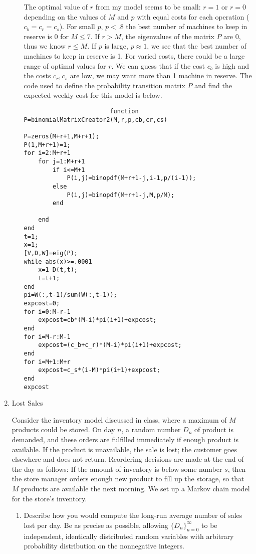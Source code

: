 \documentclass[12pt]{article}
\numberwithin{equation}{section}
\begin{document}
\begin{enumerate}
\begin{enumerate}
                        The optimal value of $r$ from my model seems to be small: $r=1$ or $r=0$ depending on the values of $M$ and $p$ with equal costs for each operation ($c_b=c_r=c_s$). For small $p$, $p<.8$ the best number of machines to keep in reserve is 0 for $M\leq 7$. If $r>M$, the eigenvalues of the matrix $P$ are 0, thus we know $r\leq M$. If $p$ is large, $p\approx 1$, we see that the best number of machines to keep in reserve is 1. For varied costs, there could be a large range of optimal values for $r$. We can guess that if the cost $c_b$ is high and the costs $c_r,c_s$ are low, we may want more than 1 machine in reserve.  The code used to define the probability transition matrix $P$ and find the expected weekly cost for this model is below.
                        \begin{lstlisting}
                        function P=binomialMatrixCreator2(M,r,p,cb,cr,cs)

P=zeros(M+r+1,M+r+1);
P(1,M+r+1)=1;
for i=2:M+r+1
    for j=1:M+r+1
        if i<=M+1
            P(i,j)=binopdf(M+r+1-j,i-1,p/(i-1));
        else
            P(i,j)=binopdf(M+r+1-j,M,p/M);
        end

    end
end
t=1;
x=1;
[V,D,W]=eig(P);
while abs(x)>=.0001
    x=1-D(t,t);
    t=t+1;
end
pi=W(:,t-1)/sum(W(:,t-1));
expcost=0;
for i=0:M-r-1
    expcost=cb*(M-i)*pi(i+1)+expcost;
end
for i=M-r:M-1
    expcost=(c_b+c_r)*(M-i)*pi(i+1)+expcost;
end
for i=M+1:M+r
    expcost=c_s*(i-M)*pi(i+1)+expcost;
end
expcost
\end{lstlisting}
            \end{enumerate}
            

\item Lost Sales

Consider the inventory model discussed in class, where a maximum of $M$ products could be stored. On day $n$, a random number $D_n$ of product is demanded, and these orders are fulfilled immediately if enough product is available. If the product is unavailable, the sale is lost; the customer goes elsewhere and does not return. Reordering decisions are made at the end of the day as follows: If the amount of inventory is below some number $s$, then the store manager orders enough new product to fill up the storage, so that $M$ products are available the next morning. We set up a Markov chain model for the store's inventory.
    \begin{enumerate}
    \item Describe how you would compute the long-run average number of sales lost per day. Be as precise as possible, allowing $\{D_n\}_{n=0}^\infty$ to be independent, identically distributed random variables with arbitrary probability distribution on the nonnegative integers.\\


\end{enumerate}
\end{enumerate}
\end{document}
